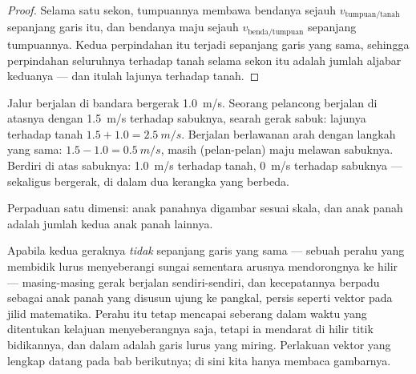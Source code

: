 \begin{proof}
Selama satu sekon, tumpuannya membawa bendanya sejauh
$v_{\text{tumpuan/tanah}}$  sepanjang garis itu, dan bendanya maju
sejauh $v_{\text{benda/tumpuan}}$  sepanjang tumpuannya. Kedua
perpindahan itu terjadi sepanjang garis yang sama, sehingga perpindahan
seluruhnya terhadap tanah selama sekon itu adalah jumlah aljabar
keduanya --- dan itulah lajunya terhadap tanah.
\end{proof}

\begin{example}\label{ex:g10:relative-motion:walkway}
Jalur berjalan di bandara bergerak \qty{1.0}{m/s}. Seorang pelancong
berjalan di atasnya dengan \qty{1.5}{m/s} terhadap sabuknya, searah
gerak sabuk: lajunya terhadap tanah $1.5 + 1.0 = \qty{2.5}{m/s}$.
Berjalan berlawanan arah dengan langkah yang sama:
$1.5 - 1.0 = \qty{0.5}{m/s}$, masih (pelan-pelan) maju melawan sabuknya.
Berdiri  di atas sabuknya: \qty{1.0}{m/s} terhadap tanah,
\qty{0}{m/s} terhadap sabuknya ---  sekaligus bergerak, di dalam dua
kerangka yang berbeda.
\end{example}

\begin{omfigure}

{\small Perpaduan satu dimensi: anak panahnya digambar sesuai skala, dan
anak panah  adalah jumlah kedua anak panah lainnya.}
\end{omfigure}

\begin{remark}\label{rem:g10:relative-motion:twodim}
Apabila kedua geraknya \emph{tidak} sepanjang garis yang sama --- sebuah
perahu yang membidik lurus menyeberangi sungai sementara arusnya
mendorongnya ke hilir --- masing-masing gerak berjalan sendiri-sendiri,
dan kecepatannya berpadu sebagai anak panah yang disusun ujung ke
pangkal, persis seperti vektor pada jilid matematika. Perahu itu tetap
mencapai seberang dalam waktu yang ditentukan kelajuan menyeberangnya
saja, tetapi ia mendarat di hilir titik bidikannya, dan 
dalam  adalah garis lurus yang miring. Perlakuan vektor
yang lengkap datang pada bab berikutnya; di sini kita hanya membaca
gambarnya.
\end{remark}

